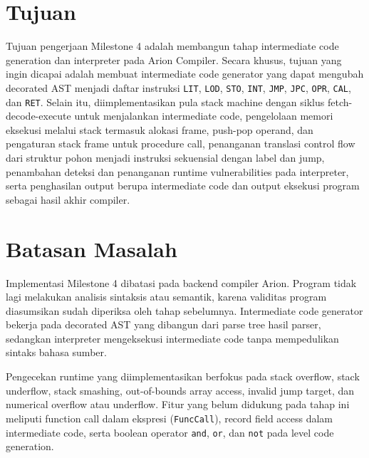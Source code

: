 \section{Tujuan}
Tujuan pengerjaan Milestone 4 adalah membangun tahap intermediate code generation dan interpreter pada Arion Compiler. Secara khusus, tujuan yang ingin dicapai adalah membuat intermediate code generator yang dapat mengubah decorated AST menjadi daftar instruksi \texttt{LIT}, \texttt{LOD}, \texttt{STO}, \texttt{INT}, \texttt{JMP}, \texttt{JPC}, \texttt{OPR}, \texttt{CAL}, dan \texttt{RET}. Selain itu, diimplementasikan pula stack machine dengan siklus fetch-decode-execute untuk menjalankan intermediate code, pengelolaan memori eksekusi melalui stack termasuk alokasi frame, push-pop operand, dan pengaturan stack frame untuk procedure call, penanganan translasi control flow dari struktur pohon menjadi instruksi sekuensial dengan label dan jump, penambahan deteksi dan penanganan runtime vulnerabilities pada interpreter, serta penghasilan output berupa intermediate code dan output eksekusi program sebagai hasil akhir compiler.

\section{Batasan Masalah}
Implementasi Milestone 4 dibatasi pada backend compiler Arion. Program tidak lagi melakukan analisis sintaksis atau semantik, karena validitas program diasumsikan sudah diperiksa oleh tahap sebelumnya. Intermediate code generator bekerja pada decorated AST yang dibangun dari parse tree hasil parser, sedangkan interpreter mengeksekusi intermediate code tanpa mempedulikan sintaks bahasa sumber.

Pengecekan runtime yang diimplementasikan berfokus pada stack overflow, stack underflow, stack smashing, out-of-bounds array access, invalid jump target, dan numerical overflow atau underflow. Fitur yang belum didukung pada tahap ini meliputi function call dalam ekspresi (\texttt{FuncCall}), record field access dalam intermediate code, serta boolean operator \texttt{and}, \texttt{or}, dan \texttt{not} pada level code generation.
